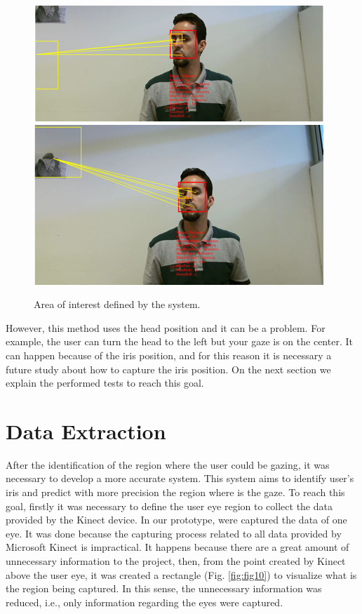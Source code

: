 \documentclass[10pt, conference]{IEEEtran}
\begin{document}
\begin{figure}[t]
	\centering
	\includegraphics{figures/pic9a.png}\\
    \includegraphics{figures/pic9b.png}\\    
    \caption{Area of interest defined by the system.}
    \label{fig:fig9}
\end{figure}

	However, this method uses the head position and it can be a problem. 
	For example, the user can turn the head to the left but your gaze is on the center. 
	It can happen because of the iris position, and for this reason it is necessary a future study about how to capture the iris position. 
	On the next section we explain the performed tests to reach this goal.

\section{Data Extraction} \label{sec:dataExtraction}

	After the identification of the region where the user could be gazing, it was necessary to develop a more accurate system. 
	This system aims to identify user’s iris and predict with more precision the region where is the gaze. 
	To reach this goal, firstly it was necessary to define the user eye region to collect the data provided by the Kinect device.
	In our prototype, were captured the data of one eye. 
	It was done because the capturing process related to all data provided by Microsoft Kinect is impractical. 
	It happens because there are a great amount of unnecessary information to the project, then, from the point created by Kinect above the user eye, it was created a rectangle (Fig. \ref{fig:fig10}) to visualize what is the region being captured. 
	In this sense, the unnecessary information was reduced, i.e., only information regarding the eyes were captured.
\end{document}
